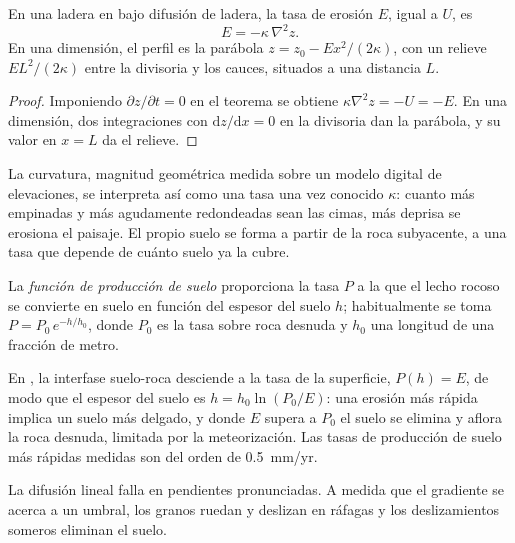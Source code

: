 \begin{proposition}\label{prop:b3:quantitative-geomorphology:curvature}
En una ladera en  bajo difusión de ladera, la tasa de erosión
$E$, igual a $U$, es
\[
E = -\kappa\,\nabla^2 z .
\]
En una dimensión, el perfil es la parábola $z = z_0 - E x^2/(2\kappa)$,
con un relieve $E L^2/(2\kappa)$ entre la divisoria y los cauces, situados a una distancia
$L$.
\end{proposition}

\begin{proof}
Imponiendo $\partial z/\partial t = 0$ en el teorema se obtiene $\kappa\nabla^2 z =
-U = -E$. En una dimensión, dos integraciones con $\mathrm{d}z/\mathrm{d}x =
0$ en la divisoria dan la parábola, y su valor en $x = L$ da el relieve.
\end{proof}

La curvatura, magnitud geométrica medida sobre un modelo digital de elevaciones, se interpreta así
como una tasa una vez conocido $\kappa$: cuanto más empinadas y más agudamente redondeadas
sean las cimas, más deprisa se erosiona el paisaje. El propio suelo se forma a partir de
la roca subyacente, a una tasa que depende de cuánto suelo ya la cubre.

\begin{definition}\label{def:b3:quantitative-geomorphology:soil-production}
La \emph{función de producción de suelo} proporciona
la tasa $P$ a la que el lecho rocoso se convierte en suelo en función del
espesor del suelo $h$; habitualmente se toma $P = P_0\,e^{-h/h_0}$, donde
$P_0$ es la tasa sobre roca desnuda y $h_0$ una longitud de una fracción de metro.
\end{definition}

En , la interfase suelo-roca desciende a la tasa de la
superficie, $P(h) = E$, de modo que el espesor del suelo es $h = h_0 \ln(P_0/E)$: una
erosión más rápida implica un suelo más delgado, y donde $E$ supera a $P_0$ el suelo
se elimina y aflora la roca desnuda, limitada por la meteorización. Las tasas de producción de suelo
más rápidas medidas son del orden de \qty{0.5}{mm/yr}.

La difusión lineal falla en pendientes pronunciadas. A medida que el gradiente se acerca a un
umbral, los granos ruedan y deslizan en ráfagas y los deslizamientos someros eliminan el
suelo.

